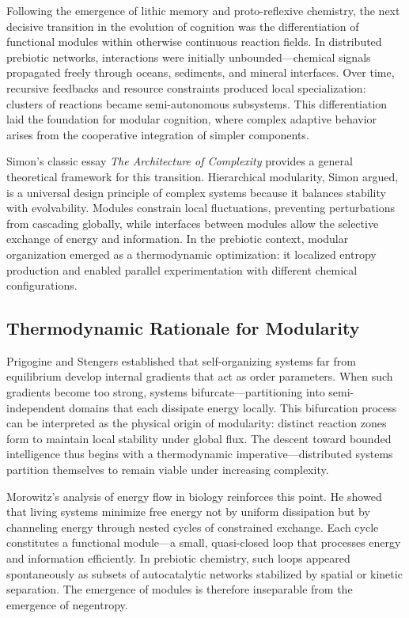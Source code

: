 \documentclass[11pt,a4paper]{article}
\begin{document}
Following the emergence of lithic memory and proto-reflexive chemistry, the next decisive transition in the evolution of cognition was the differentiation of functional modules within otherwise continuous reaction fields.  In distributed prebiotic networks, interactions were initially unbounded—chemical signals propagated freely through oceans, sediments, and mineral interfaces.  Over time, recursive feedbacks and resource constraints produced local specialization: clusters of reactions became semi-autonomous subsystems.  This differentiation laid the foundation for modular cognition, where complex adaptive behavior arises from the cooperative integration of simpler components.

Simon’s classic essay \emph{The Architecture of Complexity} \citep{Simon1962ArchitectureComplexity} provides a general theoretical framework for this transition.  Hierarchical modularity, Simon argued, is a universal design principle of complex systems because it balances stability with evolvability.  Modules constrain local fluctuations, preventing perturbations from cascading globally, while interfaces between modules allow the selective exchange of energy and information.  In the prebiotic context, modular organization emerged as a thermodynamic optimization: it localized entropy production and enabled parallel experimentation with different chemical configurations.

\subsection{Thermodynamic Rationale for Modularity}

Prigogine and Stengers \citep{Prigogine1977SelfOrganizationNonequilibrium} established that self-organizing systems far from equilibrium develop internal gradients that act as order parameters.  When such gradients become too strong, systems bifurcate—partitioning into semi-independent domains that each dissipate energy locally.  This bifurcation process can be interpreted as the physical origin of modularity: distinct reaction zones form to maintain local stability under global flux.  The descent toward bounded intelligence thus begins with a thermodynamic imperative—distributed systems partition themselves to remain viable under increasing complexity.

Morowitz’s analysis of energy flow in biology \citep{Morowitz1968EnergyFlowBiology} reinforces this point.  He showed that living systems minimize free energy not by uniform dissipation but by channeling energy through nested cycles of constrained exchange.  Each cycle constitutes a functional module—a small, quasi-closed loop that processes energy and information efficiently.  In prebiotic chemistry, such loops appeared spontaneously as subsets of autocatalytic networks stabilized by spatial or kinetic separation.  The emergence of modules is therefore inseparable from the emergence of negentropy.
\end{document}
